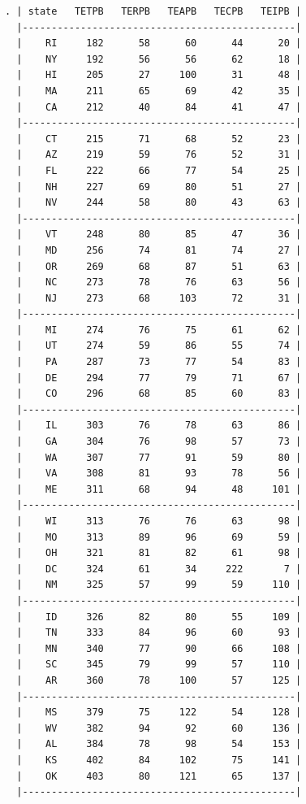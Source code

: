 \documentclass[10pt, letterpaper]{article}
\begin{document}
\begin{spacing}{1.4}
\begin{spacing}{.8}
{\begin{verbatim}
. | state   TETPB   TERPB   TEAPB   TECPB   TEIPB |
  |-----------------------------------------------|
  |    RI     182      58      60      44      20 |
  |    NY     192      56      56      62      18 |
  |    HI     205      27     100      31      48 |
  |    MA     211      65      69      42      35 |
  |    CA     212      40      84      41      47 |
  |-----------------------------------------------|
  |    CT     215      71      68      52      23 |
  |    AZ     219      59      76      52      31 |
  |    FL     222      66      77      54      25 |
  |    NH     227      69      80      51      27 |
  |    NV     244      58      80      43      63 |
  |-----------------------------------------------|
  |    VT     248      80      85      47      36 |
  |    MD     256      74      81      74      27 |
  |    OR     269      68      87      51      63 |
  |    NC     273      78      76      63      56 |
  |    NJ     273      68     103      72      31 |
  |-----------------------------------------------|
  |    MI     274      76      75      61      62 |
  |    UT     274      59      86      55      74 |
  |    PA     287      73      77      54      83 |
  |    DE     294      77      79      71      67 |
  |    CO     296      68      85      60      83 |
  |-----------------------------------------------|
  |    IL     303      76      78      63      86 |
  |    GA     304      76      98      57      73 |
  |    WA     307      77      91      59      80 |
  |    VA     308      81      93      78      56 |
  |    ME     311      68      94      48     101 |
  |-----------------------------------------------|
  |    WI     313      76      76      63      98 |
  |    MO     313      89      96      69      59 |
  |    OH     321      81      82      61      98 |
  |    DC     324      61      34     222       7 |
  |    NM     325      57      99      59     110 |
  |-----------------------------------------------|
  |    ID     326      82      80      55     109 |
  |    TN     333      84      96      60      93 |
  |    MN     340      77      90      66     108 |
  |    SC     345      79      99      57     110 |
  |    AR     360      78     100      57     125 |
  |-----------------------------------------------|
  |    MS     379      75     122      54     128 |
  |    WV     382      94      92      60     136 |
  |    AL     384      78      98      54     153 |
  |    KS     402      84     102      75     141 |
  |    OK     403      80     121      65     137 |
  |-----------------------------------------------|

\end{verbatim}}
\end{spacing}
\end{spacing}
\end{document}
